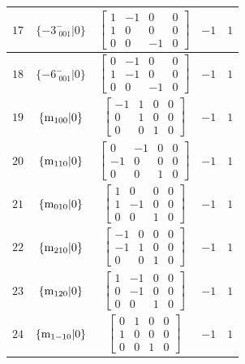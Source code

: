 \documentclass[fleqn,8pt]{jsarticle}
\begin{document}
\begin{longtable}{ccccc}
$ 17 $ & $ \{-3^{-}_{\,\,001}|0\} $ & $ \begin{bmatrix} 1 & -1 & 0 & 0 \\ 1 & 0 & 0 & 0 \\ 0 & 0 & -1 & 0 \end{bmatrix} $ & $ -1 $ & $ 1 $ \\ \hline
$ 18 $ & $ \{-6^{-}_{\,\,001}|0\} $ & $ \begin{bmatrix} 0 & -1 & 0 & 0 \\ 1 & -1 & 0 & 0 \\ 0 & 0 & -1 & 0 \end{bmatrix} $ & $ -1 $ & $ 1 $ \\ \hline
$ 19 $ & $ \{{\rm m}_{100}|0\} $ & $ \begin{bmatrix} -1 & 1 & 0 & 0 \\ 0 & 1 & 0 & 0 \\ 0 & 0 & 1 & 0 \end{bmatrix} $ & $ -1 $ & $ 1 $ \\ \hline
$ 20 $ & $ \{{\rm m}_{110}|0\} $ & $ \begin{bmatrix} 0 & -1 & 0 & 0 \\ -1 & 0 & 0 & 0 \\ 0 & 0 & 1 & 0 \end{bmatrix} $ & $ -1 $ & $ 1 $ \\ \hline
$ 21 $ & $ \{{\rm m}_{010}|0\} $ & $ \begin{bmatrix} 1 & 0 & 0 & 0 \\ 1 & -1 & 0 & 0 \\ 0 & 0 & 1 & 0 \end{bmatrix} $ & $ -1 $ & $ 1 $ \\ \hline
$ 22 $ & $ \{{\rm m}_{210}|0\} $ & $ \begin{bmatrix} -1 & 0 & 0 & 0 \\ -1 & 1 & 0 & 0 \\ 0 & 0 & 1 & 0 \end{bmatrix} $ & $ -1 $ & $ 1 $ \\ \hline
$ 23 $ & $ \{{\rm m}_{120}|0\} $ & $ \begin{bmatrix} 1 & -1 & 0 & 0 \\ 0 & -1 & 0 & 0 \\ 0 & 0 & 1 & 0 \end{bmatrix} $ & $ -1 $ & $ 1 $ \\ \hline
$ 24 $ & $ \{{\rm m}_{1-10}|0\} $ & $ \begin{bmatrix} 0 & 1 & 0 & 0 \\ 1 & 0 & 0 & 0 \\ 0 & 0 & 1 & 0 \end{bmatrix} $ & $ -1 $ & $ 1 $ \\ \hline

\end{longtable}
\end{document}
